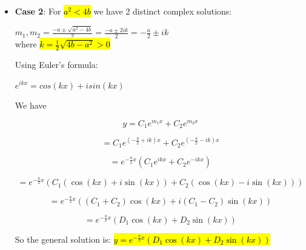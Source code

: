 \documentclass{article}
\begin{document}
\begin{enumerate}
\begin{itemize}
\begin{itemize}
                \item \textbf{Case 2}: For \hl{$a^2 < 4b$} we have 2 distinct complex solutions:
                \begin{center}
                  $m_1,m_2 = \frac{-a \pm \sqrt{a^2-4b}}{2} = \frac{-a \pm 2ik}{2} = - \frac{a}{2} \pm ik$\\
                  where \hl{$k = \frac{1}{2} \sqrt{4b-a^2} > 0$}
                \end{center}
                Using Euler's formula:
                \begin{center}
                  $e^{ikx} = cos(kx) + isin(kx)$
                \end{center}
                
                We have

                \[
                y = C_1 e^{m_1 x} + C_2 e^{m_2 x}
                \]

                \[
                = C_1 e^{\left(-\frac{a}{2} + ik\right)x} + C_2 e^{\left(-\frac{a}{2} - ik\right)x}
                \]

                \[
                = e^{-\frac{a}{2}x} \left( C_1 e^{ikx} + C_2 e^{-ikx} \right)
                \]

                \[
                = e^{-\frac{a}{2}x} \left( C_1 \left(\cos(kx) + i\sin(kx)\right) + C_2 \left(\cos(kx) - i\sin(kx)\right) \right)
                \]

                \[
                = e^{-\frac{a}{2}x} \left( \left(C_1 + C_2\right) \cos(kx) + i \left(C_1 - C_2\right) \sin(kx) \right)
                \]

                \[
                = e^{-\frac{a}{2}x} \left( D_1 \cos(kx) + D_2 \sin(kx) \right)
                \]

                So the general solution is:
                \hl{$y = e^{-\frac{a}{2}x} \left( D_1 \cos(kx) + D_2 \sin(kx) \right)$}


\end{itemize}
\end{itemize}
\end{enumerate}
\end{document}
